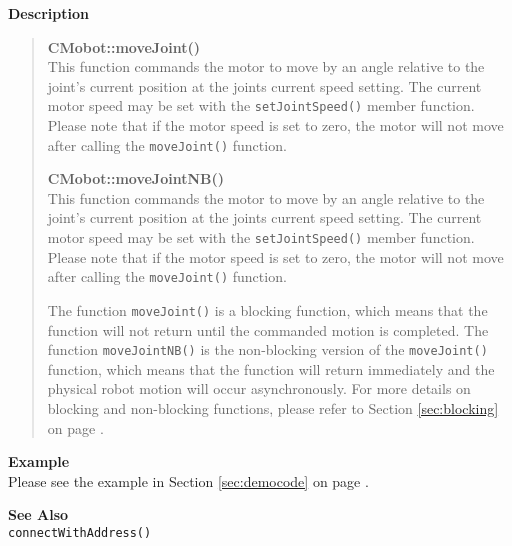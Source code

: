 \noindent
{\bf Description}\\
\vspace{-12pt}
\begin{quote}
{\bf CMobot::moveJoint()}\\
This function commands the motor to move by an angle relative to the
joint's current position at the joints current speed setting.
The current motor speed may be set with the
\texttt{setJointSpeed()} member function. Please note that if the motor speed
is set to zero, the motor will not move after calling the
\texttt{moveJoint()} function. 

{\bf CMobot::moveJointNB()}\\
This function commands the motor to move by an angle relative to the
joint's current position at the joints current speed setting.
The current motor speed may be set with the
\texttt{setJointSpeed()} member function. Please note that if the motor speed
is set to zero, the motor will not move after calling the
\texttt{moveJoint()} function. 

The function \texttt{moveJoint()} is a blocking function, which means that 
the function will not return until the commanded motion is 
completed. The function \texttt{moveJointNB()} is the non-blocking version of
the \texttt{moveJoint()} function, which means that the function will return
immediately and the physical robot motion will occur asynchronously. For
more details on blocking and non-blocking functions, please refer to 
Section \ref{sec:blocking} on page \pageref{sec:blocking}.\\
\end{quote}

\noindent
{\bf Example}\\
Please see the example in Section \ref{sec:democode} on page \pageref{sec:democode}.\\
\noindent

\noindent
{\bf See Also}\\
\texttt{connectWithAddress()}

